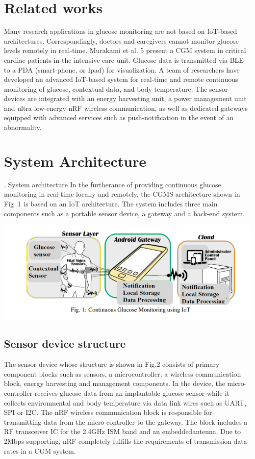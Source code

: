 \documentclass{article}
\begin{document}
\section{Related works}

Many research applications in glucose monitoring are not based on IoT-based architectures. Correspondingly, doctors and caregivers cannot monitor glucose levels remotely in real-time. Murakami et al. 5 present a CGM system in critical cardiac patients in the intensive care unit. Glucose data is transmitted via BLE to a PDA (smart-phone, or Ipad) for visualization.
A team of researchers have developed an advanced IoT-based system for real-time and remote continuous monitoring of glucose, contextual data, and body temperature. The sensor devices are integrated with an energy harvesting unit, a power management unit and ultra low-energy nRF wireless communication, as well as dedicated gateways equipped with advanced services such as push-notification in the event of an abnormality.

\section{ System Architecture}
. System architecture
In the furtherance of providing continuous glucose monitoring in real-time locally and remotely, the CGMS architecture shown in Fig .1 is based on an IoT architecture. The system includes three main components such as a portable
sensor device, a gateway and a back-end system.

\begin{center}
  \includegraphics[scale=0.5]{sys arch.png}
  \label{fig:sys}
\end{center}

\subsection{Sensor device structure}
The sensor device whose structure is shown in Fig.2 consists of primary component blocks such as sensors, a microcontroller, a wireless communication block, energy harvesting and management components. In the device, the micro-controller receives glucose data from an implantable glucose sensor while it collects environmental and body temperature via data link wires such as UART, SPI or I2C.
The nRF wireless communication block is responsible for transmitting data from the micro-controller to the gateway. The block includes a RF transceiver IC for the 2.4GHz ISM band and an embeddedantenna. Due to 2Mbps supporting, nRF completely fulfills the requirements of transmission data rates in a CGM system.
\end{document}
